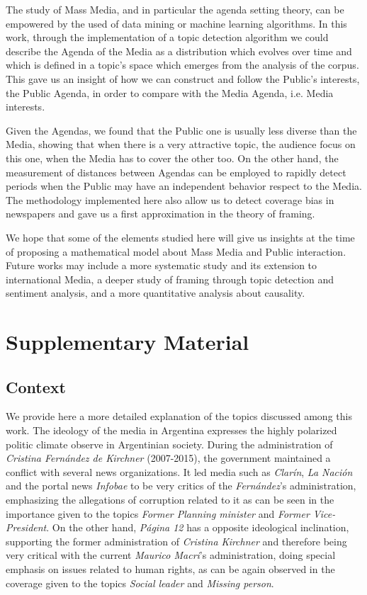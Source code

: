 \documentclass[a4paper, 12pt]{article}
\begin{document}
\par The study of Mass Media, and in particular the agenda setting theory, can be empowered by the used of data mining or machine learning algorithms. 
In this work, through the implementation of a topic detection algorithm we could describe the Agenda of the Media as a distribution which evolves over time and which is defined in a topic's space which emerges from the analysis of the corpus.
This gave us an insight of how we can construct and follow the Public's interests, the Public Agenda, in order to compare with the Media Agenda, i.e. Media interests. 
\par Given the Agendas, we found that the Public one is usually less diverse than the Media, showing that when there is a very attractive topic, the audience focus on this one, when the Media has to cover the other too. 
On the other hand, the measurement of distances between Agendas can be employed to rapidly detect periods when the Public may have an independent behavior respect to the Media. The methodology implemented here also allow us to detect coverage bias in newspapers and gave us a first approximation in the theory of framing. 
\par We hope that some of the elements studied here will give us insights at the time of proposing a mathematical model about Mass Media and Public interaction. Future works may include a more systematic study and its extension to international Media, a deeper study of framing through topic detection and sentiment analysis, and a more quantitative analysis about causality.

\newpage
\section{Supplementary Material}
\subsection{Context}
\label{sec:Context}

\par We provide here a more detailed explanation of the topics discussed among this work.
The ideology of the media in Argentina expresses the highly polarized politic climate observe in Argentinian society.
During the administration of \emph{Cristina Fern\'andez de Kirchner} (2007-2015), the government maintained a conflict with several news organizations.
It led media such as \emph{Clar\'in}, \emph{La Naci\'on} and the portal news \emph{Infobae} to be very critics of the \emph{Fern\'andez}'s administration, emphasizing the allegations of corruption related to it as can be seen in the importance given to the topics \emph{Former Planning minister} and \emph{Former Vice-President}.
On the other hand, \emph{P\'agina 12} has a opposite ideological inclination, supporting the former administration of \emph{Cristina Kirchner} and therefore being very critical with the current \emph{Maurico Macri}'s administration, doing special emphasis on issues related to human rights, as can be again observed in the coverage given to the topics \emph{Social leader} and \emph{Missing person}.
\end{document}
